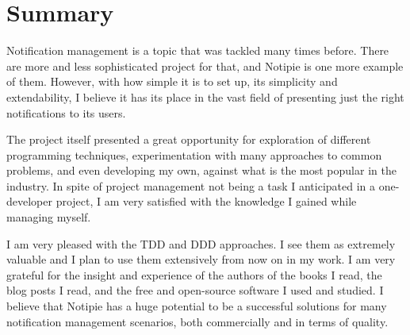 \section{Summary}\label{sec:summary}

Notification management is a topic
that was tackled many times before.
There are more and less sophisticated
project for that,
and Notipie is one more example of them.
However,
with how simple it is to set up,
its simplicity and extendability,
I believe it has its place
in the vast field of
presenting just the right notifications
to its users.

The project itself presented a great opportunity
for exploration of different programming techniques,
experimentation with many approaches to common problems,
and even developing my own,
against what is the most popular in the industry.
In spite of project management
not being a task I anticipated
in a one-developer project,
I am very satisfied with the knowledge
I gained while managing myself.

I am very pleased with the TDD and DDD approaches.
I see them as extremely valuable
and I plan to use them extensively
from now on in my work.
I am very grateful for the insight
and experience of the authors of the books I read,
the blog posts I read,
and the free and open-source software
I used and studied.
I believe that Notipie has a huge potential
to be a successful solutions for many
notification management scenarios,
both commercially
and in terms of quality.
